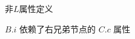 \begin{frame}{}
  \begin{center}
    非$L$属性定义

    \vspace{0.80cm}
    $B.i$ 依赖了右兄弟节点的 $C.c$ 属性
  \end{center}
\end{frame}









